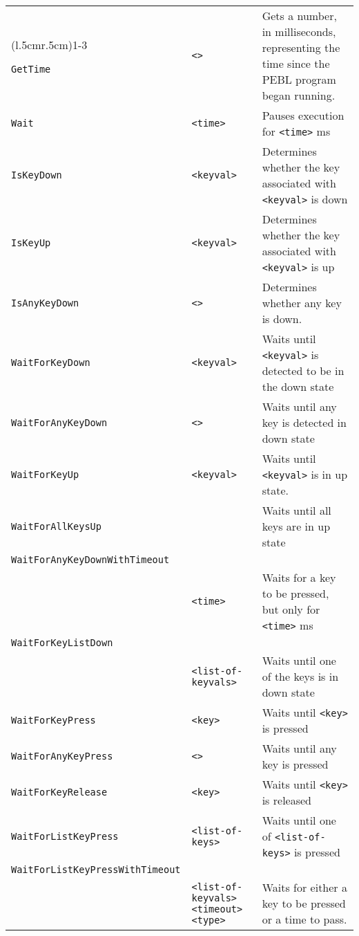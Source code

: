 \begin{longtable}{p{3cm}p{3cm}p{6cm}}
\addlinespace[0.2cm] 
\midrule 
\multicolumn{3}{c}{\textbf{Misc Event Functions}}\\ 
\cmidrule(l{.5cm}r{.5cm}){1-3} 


\verb+GetTime+ &\verb+<>+ &Gets a number, in milliseconds, representing the time since the PEBL program began running.\\ 
\verb+Wait+ &\verb+<time>+ &Pauses execution for \verb+<time>+ ms \\ 
\verb+IsKeyDown+ &\verb+<keyval>+ &Determines whether the key associated with \verb+<keyval>+ is down \\ 
\verb+IsKeyUp+ &\verb+<keyval>+ &Determines whether the key associated with \verb+<keyval>+ is up\\ 
\verb+IsAnyKeyDown+ &\verb+<>+ &Determines whether any key is down.\\ 
\verb+WaitForKeyDown+ & \verb+<keyval>+ &Waits until \verb+<keyval>+ is detected to be in the down state\\ 
\verb+WaitForAnyKeyDown+ &\hspace{0.5cm} \verb+<>+ &Waits until any key is detected in down state\\ 
\verb+WaitForKeyUp+ &\verb+<keyval>+ &Waits until \verb+<keyval>+ is in up state.\\ 
\verb+WaitForAllKeysUp+ & &Waits until all keys are in up state\\ 
\verb+WaitForAnyKeyDownWithTimeout+ & & \\ 
& \verb+<time>+ & Waits for a key to be pressed, but only for \verb+<time>+ ms\\ 

\verb+WaitForKeyListDown+ & & \\ 
& \verb+<list-of-keyvals>+ & Waits until one of the keys is in down state\\ 
\verb+WaitForKeyPress+ &\verb+<key>+ &Waits until \verb+<key>+ is pressed\\ 
\verb+WaitForAnyKeyPress+ &\hspace{0.5cm} \verb+<>+ &Waits until any key is pressed\\ 
\verb+WaitForKeyRelease+ &\hspace{0.5cm} \verb+<key>+ & Waits until \verb+<key>+ is released\\ 
\verb+WaitForListKeyPress+ &\hspace{0.5cm}\verb+<list-of-keys>+ &Waits until one of \verb+<list-of-keys>+ is pressed \\ 
\verb+WaitForListKeyPressWithTimeout+&\\
&\verb+<list-of-keyvals>+ \verb+<timeout>+ \verb+<type>+ & Waits for
either a key to be pressed or a time to pass.\\


\end{longtable}
